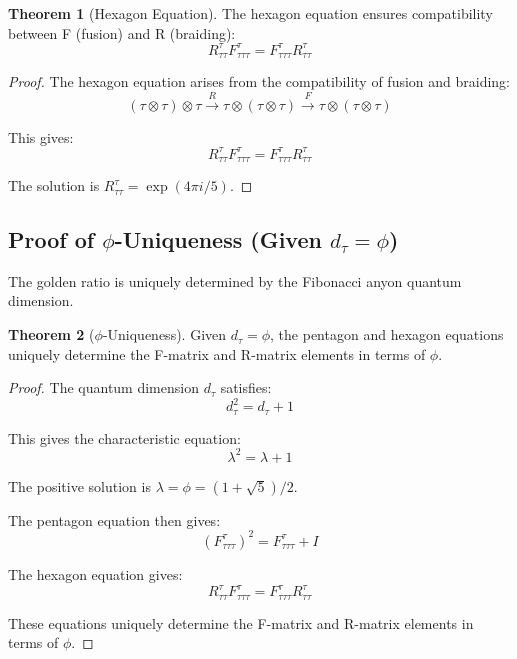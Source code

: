 \documentclass[11pt]{article}
\theoremstyle{definition}
\newtheorem{theorem}{Theorem}[section]
\newcommand{\goldenratio}{\phi}
\newcommand{\fibonacci}{\tau}
\begin{document}
\begin{theorem}[Hexagon Equation]
The hexagon equation ensures compatibility between F (fusion) and R (braiding):
\begin{equation}
R^{\tau}_{\tau\tau} F^{\tau}_{\tau\tau\tau} = F^{\tau}_{\tau\tau\tau} R^{\tau}_{\tau\tau}
\end{equation}
\end{theorem}

\begin{proof}
The hexagon equation arises from the compatibility of fusion and braiding:
\begin{equation}
(\tau \otimes \tau) \otimes \tau \xrightarrow{R} \tau \otimes (\tau \otimes \tau) \xrightarrow{F} \tau \otimes (\tau \otimes \tau)
\end{equation}

This gives:
\begin{equation}
R^{\tau}_{\tau\tau} F^{\tau}_{\tau\tau\tau} = F^{\tau}_{\tau\tau\tau} R^{\tau}_{\tau\tau}
\end{equation}

The solution is $R^{\tau}_{\tau\tau} = \exp(4\pi i/5)$.
\end{proof}

\subsection{Proof of $\goldenratio$-Uniqueness (Given $d_\fibonacci = \goldenratio$)}

The golden ratio is uniquely determined by the Fibonacci anyon quantum dimension.

\begin{theorem}[$\goldenratio$-Uniqueness]
Given $d_\fibonacci = \goldenratio$, the pentagon and hexagon equations uniquely determine the F-matrix and R-matrix elements in terms of $\goldenratio$.
\end{theorem}

\begin{proof}
The quantum dimension $d_\tau$ satisfies:
\begin{equation}
d_\tau^2 = d_\tau + 1
\end{equation}

This gives the characteristic equation:
\begin{equation}
\lambda^2 = \lambda + 1
\end{equation}

The positive solution is $\lambda = \goldenratio = (1 + \sqrt{5})/2$.

The pentagon equation then gives:
\begin{equation}
(F^{\tau}_{\tau\tau\tau})^2 = F^{\tau}_{\tau\tau\tau} + I
\end{equation}

The hexagon equation gives:
\begin{equation}
R^{\tau}_{\tau\tau} F^{\tau}_{\tau\tau\tau} = F^{\tau}_{\tau\tau\tau} R^{\tau}_{\tau\tau}
\end{equation}

These equations uniquely determine the F-matrix and R-matrix elements in terms of $\goldenratio$.
\end{proof}
\end{document}
